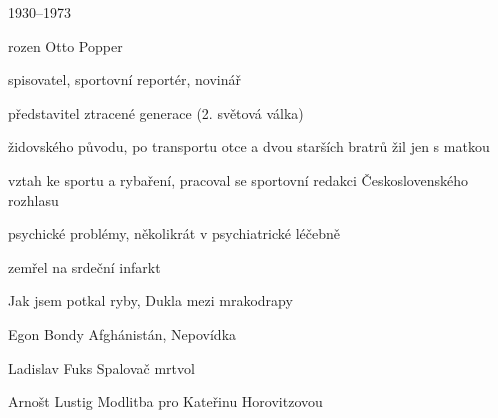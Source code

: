 {\parag{\getauthor}
\begin{compactitem}
	\item 1930--1973
	\item rozen Otto Popper
	\item spisovatel, sportovní reportér, novinář
	\item představitel ztracené generace (2. světová válka)
	\item židovského původu, po transportu otce a dvou starších bratrů žil jen s matkou
	\item vztah ke sportu a rybaření, pracoval se sportovní redakci Československého rozhlasu
	\item psychické problémy, několikrát v psychiatrické léčebně
	\item zemřel na srdeční infarkt
	\item Jak jsem potkal ryby, Dukla mezi mrakodrapy
\end{compactitem}

\begin{compactdesc}
	\item[Egon Bondy] Afghánistán, Nepovídka
	\item[Ladislav Fuks] Spalovač mrtvol
	\item[Arnošt Lustig] Modlitba pro Kateřinu Horovitzovou
\end{compactdesc}
}
